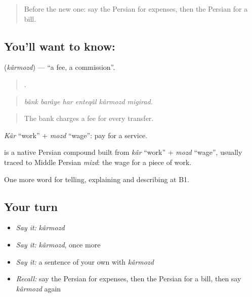 \label{lesson:FA-C415-karmozd}



\begin{quote}
Before the new one: say the Persian for expenses, then the Persian for a bill.
\end{quote}

\subsection*{You'll want to know: }
\textbf{} (\emph{kârmozd}) — \textquotedblleft{}a fee, a commission\textquotedblright{}.

\begin{quote}
     .
\end{quote}

\begin{quote}
\emph{bânk barâye har enteqâl kârmozd migirad.}
\end{quote}

\begin{quote}
The bank charges a fee for every transfer.
\end{quote}

\emph{Kâr} \textquotedblleft{}work\textquotedblright{} + \emph{mozd} \textquotedblleft{}wage\textquotedblright{}: pay for a service.

\begin{cousinweb}
\textbf{} is a native Persian compound built from \emph{kâr} \textquotedblleft{}work\textquotedblright{} + \emph{mozd} \textquotedblleft{}wage\textquotedblright{}, usually traced to Middle Persian \emph{mizd}: the wage for a piece of work.
\end{cousinweb}

\begin{grammarlens}[title={What you've built}]
One more word for telling, explaining and describing at B1.
\end{grammarlens}

\subsection*{Your turn}
\begin{itemize}
\raggedright
  \item \emph{Say it:} \emph{kârmozd}
  \item \emph{Say it:} \emph{kârmozd}, once more
  \item \emph{Say it:} a sentence of your own with \emph{kârmozd}
  \item \emph{Recall:} say the Persian for expenses, then the Persian for a bill, then say \emph{kârmozd} again
\end{itemize}

